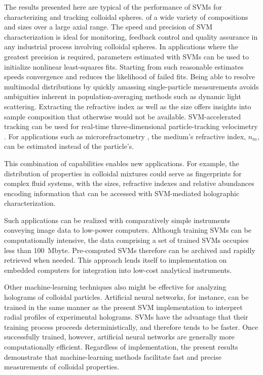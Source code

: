 \documentclass[10pt,letterpaper]{article}
\begin{document}
The results presented here are typical of the performance of SVMs
for characterizing and tracking colloidal spheres.
of a wide
variety of compositions and sizes over a large axial range.
The speed and precision of SVM characterization
is ideal for monitoring, feedback control and quality assurance
in any industrial process involving colloidal spheres.
In applications where the greatest precision is required, parameters
estimated with SVMs can be used to initialize nonlinear least-squares
fits.
Starting from such reasonable estimates speeds convergence and
reduces the likelihood of failed fits.
Being able to resolve multimodal distributions
by quickly amassing single-particle measurements
avoids ambiguities inherent in population-averaging
methods such as dynamic light scattering.
Extracting the refractive index as well as the size offers
insights into sample composition that otherwise would
not be available.
SVM-accelerated tracking can be used for real-time
three-dimensional particle-tracking velocimetry \cite{cheong09}.
For applications such as microrefractometry \cite{shpaisman12},
the medium's refractive index, $n_m$, can 
be estimated instead of the particle's.

This combination of capabilities enables new applications.
For example, the distribution of properties in colloidal mixtures
could serve as fingerprints for complex fluid systems, with the
sizes, refractive indexes and relative abundances encoding information
that can be accessed with SVM-mediated holographic
characterization.

Such applications can be realized with comparatively
simple instruments \cite{krishnatreya14} conveying image data
to low-power computers.
Although training SVMs can be computationally intensive,
the data comprising a set of trained SVMs occupies less
than \SI{100}{\mega byte}.
Pre-computed SVMs therefore can be archived and rapidly
retrieved when needed.
This approach lends itself to
implementation on embedded computers for integration into
low-cost analytical instruments.

Other machine-learning techniques also might be effective
for analyzing holograms of colloidal particles.  Artificial
neural networks, for instance, can be trained in the same
manner as the present SVM implementation to interpret
radial profiles of experimental holograms.  SVMs have the advantage
that their training process proceeds deterministically, and therefore
tends to be faster.  Once successfully trained, however, artificial
neural networks are generally more computationally efficient.
Regardless of implementation, the present results demonstrate
that machine-learning methods facilitate
fast and precise measurements of colloidal properties.
\end{document}
